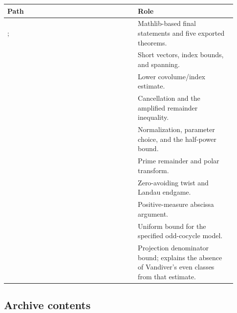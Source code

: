 \begin{longtable}{@{}P{0.53\linewidth}P{0.40\linewidth}@{}}
\toprule
Path & Role\\
\midrule
\endhead
{};  &
Mathlib-based final statements and five exported theorems.\\[4pt]
 &
Short vectors, index bounds, and spanning.\\[4pt]
 &
Lower covolume/index estimate.\\[4pt]
 &
Cancellation and the amplified remainder inequality.\\[4pt]
 &
Normalization, parameter choice, and the half-power bound.\\[4pt]
 &
Prime remainder and polar transform.\\[4pt]
 &
Zero-avoiding twist and Landau endgame.\\[4pt]
 &
Positive-measure abscissa argument.\\[4pt]
 &
Uniform bound for the specified odd-cocycle model.\\[4pt]
 &
Projection denominator bound; explains the absence of
Vandiver's even classes from that estimate.\\
\bottomrule
\end{longtable}

\subsection{Archive contents}

